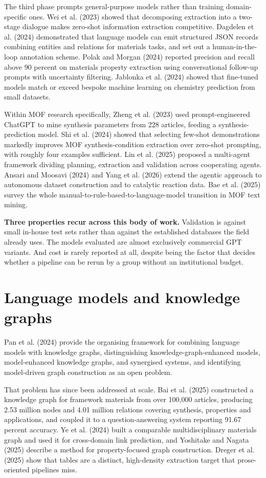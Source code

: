 \documentclass[11pt,a4paper,oneside]{report}
\begin{document}
The third phase prompts general-purpose models rather than training domain-specific ones. Wei et al. (2023) showed that decomposing extraction into a two-stage dialogue makes zero-shot information extraction competitive. Dagdelen et al. (2024) demonstrated that language models can emit structured JSON records combining entities and relations for materials tasks, and set out a human-in-the-loop annotation scheme. Polak and Morgan (2024) reported precision and recall above 90 percent on materials property extraction using conversational follow-up prompts with uncertainty filtering. Jablonka et al. (2024) showed that fine-tuned models match or exceed bespoke machine learning on chemistry prediction from small datasets.

Within MOF research specifically, Zheng et al. (2023) used prompt-engineered ChatGPT to mine synthesis parameters from 228 articles, feeding a synthesis-prediction model. Shi et al. (2024) showed that selecting few-shot demonstrations markedly improves MOF synthesis-condition extraction over zero-shot prompting, with roughly four examples sufficient. Lin et al. (2025) proposed a multi-agent framework dividing planning, extraction and validation across cooperating agents. Ansari and Moosavi (2024) and Yang et al. (2026) extend the agentic approach to autonomous dataset construction and to catalytic reaction data. Bae et al. (2025) survey the whole manual-to-rule-based-to-language-model transition in MOF text mining.

\textbf{Three properties recur across this body of work.} Validation is against small in-house test sets rather than against the established databases the field already uses. The models evaluated are almost exclusively commercial GPT variants. And cost is rarely reported at all, despite being the factor that decides whether a pipeline can be rerun by a group without an institutional budget.

\section{Language models and knowledge graphs}

Pan et al. (2024) provide the organising framework for combining language models with knowledge graphs, distinguishing knowledge-graph-enhanced models, model-enhanced knowledge graphs, and synergised systems, and identifying model-driven graph construction as an open problem.

That problem has since been addressed at scale. Bai et al. (2025) constructed a knowledge graph for framework materials from over 100,000 articles, producing 2.53 million nodes and 4.01 million relations covering synthesis, properties and applications, and coupled it to a question-answering system reporting 91.67 percent accuracy. Ye et al. (2024) built a comparable multidisciplinary materials graph and used it for cross-domain link prediction, and Yoshitake and Nagata (2025) describe a method for property-focused graph construction. Dreger et al. (2025) show that tables are a distinct, high-density extraction target that prose-oriented pipelines miss.
\end{document}
